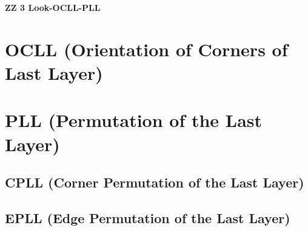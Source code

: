 \documentclass[landscape,a4paper]{article}
\begin{document}
\begin{center}
	{\Huge{\textbf{ZZ 3 Look-OCLL-PLL}}}
\end{center}

\begin{multicols}{2}
\section{OCLL (Orientation of Corners of Last Layer)}



\section{PLL (Permutation of the Last Layer)}

\subsection{CPLL (Corner Permutation of the Last Layer)}




\subsection{EPLL (Edge Permutation of the Last Layer)}



\end{multicols}
\end{document}
